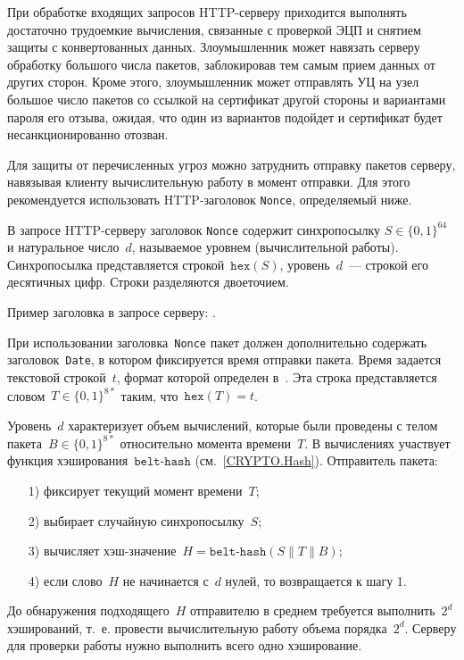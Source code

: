 При обработке входящих запросов HTTP-серверу приходится выполнять 
достаточно трудоемкие вычисления, связанные с проверкой ЭЦП и снятием 
защиты с конвертованных данных.
%
Злоумышленник может навязать серверу обработку большого числа пакетов, 
заблокировав тем самым прием данных от других сторон. 
%
Кроме этого, злоумышленник может отправлять УЦ на узел~
большое число пакетов со ссылкой на сертификат другой стороны и вариантами 
пароля его отзыва, ожидая, что один из вариантов подойдет и сертификат 
будет несанкционированно отозван.

Для защиты от перечисленных угроз можно затруднить отправку пакетов 
серверу, навязывая клиенту вычислительную работу в момент отправки.
Для этого рекомендуется использовать HTTP-заголовок \texttt{Nonce}, 
определяемый ниже.

В запросе HTTP-серверу заголовок \texttt{Nonce} содержит синхропосылку 
$S\in\{0,1\}^{64}$ и натуральное число~$d$, называемое уровнем 
(вычислительной работы).
%
Синхропосылка представляется строкой~$\texttt{hex}(S)$, уровень~$d$~--- 
строкой его десятичных цифр. Строки разделяются двоеточием.

Пример заголовка в запросе серверу: .

При использовании заголовка~\texttt{Nonce} пакет должен дополнительно
содержать заголовок~\texttt{Date}, в котором фиксируется время отправки 
пакета. Время задается текстовой строкой~$t$, формат которой определен 
в~\cite{HTTP}. Эта строка представляется словом~$T\in\{0,1\}^{8*}$ таким, 
что~$\texttt{hex}(T)=t$.

Уровень~$d$ характеризует объем вычислений, которые были проведены
с телом пакета~$B\in\{0,1\}^{8*}$ относительно момента времени~$T$.
%
В вычислениях участвует функция хэширования~$\texttt{belt-hash}$
(см.~\ref{CRYPTO.Hash}). Отправитель пакета:
\begin{enumerate}
\item[1)]
фиксирует текущий момент времени~$T$;
\item[2)]
выбирает случайную синхропосылку~$S$;
\item[3)]
вычисляет хэш-значение~$H=\texttt{belt-hash}(S\parallel T\parallel B)$;
\item[4)]
если слово~$H$ не начинается с~$d$ нулей, то возвращается к шагу 1.
\end{enumerate}

До обнаружения подходящего~$H$ отправителю в среднем требуется 
выполнить~$2^d$ хэширований, т.~е. провести вычислительную работу объема  
порядка~$2^d$. Серверу для проверки работы нужно выполнить всего одно
хэширование.

